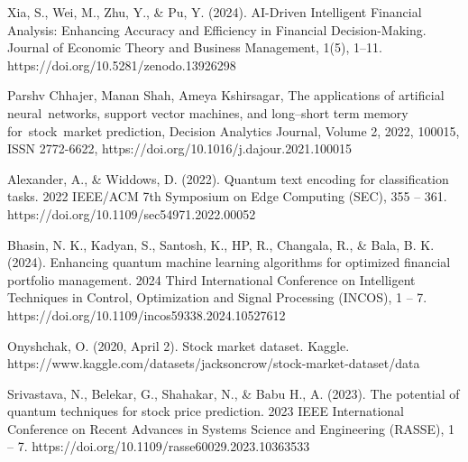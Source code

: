\documentclass{article}
\begin{document}
\newpage

\begin{thebibliography}{99}
    Xia, S., Wei, M., Zhu, Y., \& Pu, Y. (2024). AI-Driven Intelligent Financial Analysis: Enhancing Accuracy and Efficiency in Financial Decision-Making. Journal of Economic Theory and Business Management, 1(5), 1–11. https://doi.org/10.5281/zenodo.13926298

    Parshv Chhajer, Manan Shah, Ameya Kshirsagar,
    The applications of artificial neural networks, support vector machines, and long–short term memory for stock market prediction,
    Decision Analytics Journal,
    Volume 2,
    2022,
    100015,
    ISSN 2772-6622,
    https://doi.org/10.1016/j.dajour.2021.100015

    Alexander, A., \& Widdows, D. (2022). Quantum text encoding for classification tasks. 2022 IEEE/ACM 7th Symposium on Edge Computing (SEC), 355 – 361. https://doi.org/10.1109/sec54971.2022.00052 

    Bhasin, N. K., Kadyan, S., Santosh, K., HP, R., Changala, R., \& Bala, B. K. (2024). Enhancing quantum machine learning algorithms for optimized financial portfolio management. 2024 Third International Conference on Intelligent Techniques in Control, Optimization and Signal Processing (INCOS), 1 – 7. https://doi.org/10.1109/incos59338.2024.10527612 

    Onyshchak, O. (2020, April 2). Stock market dataset. Kaggle. https://www.kaggle.com/datasets/jacksoncrow/stock-market-dataset/data 

    Srivastava, N., Belekar, G., Shahakar, N., \& Babu H., A. (2023). The potential of quantum techniques for stock price prediction. 2023 IEEE International Conference on Recent Advances in Systems Science and Engineering (RASSE), 1 – 7. https://doi.org/10.1109/rasse60029.2023.10363533
    
\end{thebibliography}

\newpage

\glsaddall
\printglossaries
\end{document}
